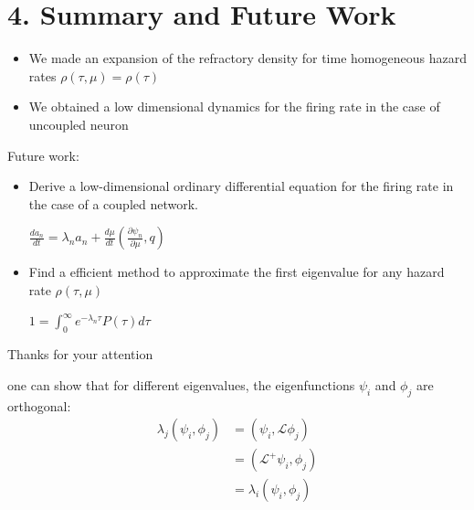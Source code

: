 \documentclass{beamer}
\begin{document}
\section{4. Summary and Future Work}
\begin{frame}
\begin{itemize}
	\frametitle{4. Summary and Future Work}
	\item 	We made an expansion of the refractory density for time homogeneous hazard rates $\rho(\tau,\mu)=\rho(\tau)$ 
	\pause
	\item We obtained a low dimensional dynamics for the firing rate in the case of uncoupled neuron
\end{itemize}
\pause
Future work:
\begin{itemize}
	
	\item Derive a low-dimensional ordinary differential equation for the firing rate in the case of a coupled network.
	
	\vspace{0.1cm}
	\hspace{2cm} $\frac{d a_n}{dt}= \lambda_na_n+\frac{d\mu}{dt}(\frac{\partial \psi_n}{\partial \mu},q)$
	\pause
	\item Find a efficient method to approximate the first eigenvalue for any hazard rate $\rho(\tau,\mu)$
	
		\vspace{0.1cm}
		\hspace{2.4cm} $1=\int_0^{\infty}e^{-\lambda_n\tau}P(\tau)d\tau$


\end{itemize}




\end{frame}

\begin{frame}

\hspace{2cm} \Large{Thanks for your attention}

\end{frame}






\begin{frame}
 one can show that for different eigenvalues, the eigenfunctions $\psi_i$ and $\phi_j$ are orthogonal:
\begin{align}
\lambda_j(\psi_i,\phi_j) 
&=(\psi_i,\mathcal{L}\phi_j) \nonumber \\
&=(\mathcal{L}^+\psi_i,\phi_j)  \nonumber \\
&=\lambda_i(\psi_i,\phi_j) \nonumber
\end{align}

\end{frame}
\end{document}
